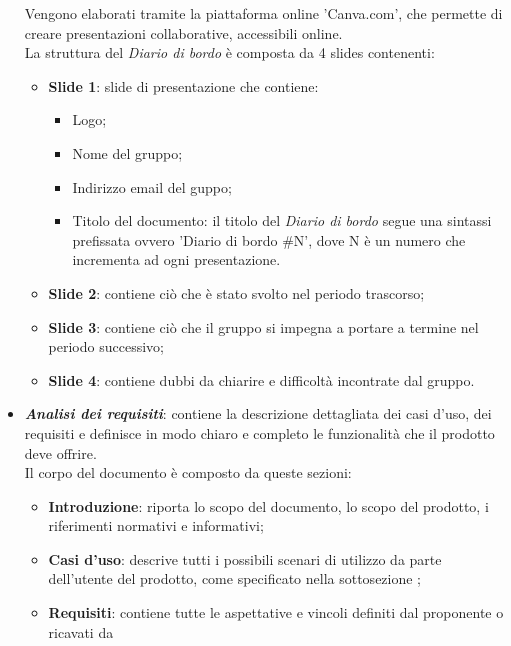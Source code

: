 \begin{itemize}
            Vengono elaborati tramite la piattaforma online 'Canva.com', che permette di creare presentazioni collaborative, accessibili online.\\
            La struttura del \textit{Diario di bordo} è composta da 4 slides contenenti:
            \begin{itemize}
                  \item \textbf{Slide 1}: slide di presentazione che contiene:
                        \begin{itemize}
                              \item Logo;
                              \item Nome del gruppo;
                              \item Indirizzo email del guppo;
                              \item Titolo del documento: il titolo del \textit{Diario di bordo} segue una sintassi
                                    prefissata ovvero 'Diario di bordo \#N', dove N è un numero che incrementa ad
                                    ogni presentazione.
                        \end{itemize}
                  \item \textbf{Slide 2}: contiene ciò che è stato svolto nel periodo trascorso;
                  \item \textbf{Slide 3}: contiene ciò che il gruppo si impegna a portare a termine nel periodo successivo;
                  \item \textbf{Slide 4}: contiene dubbi da chiarire e difficoltà incontrate dal gruppo.
            \end{itemize}
      \item \textit{\textbf{Analisi dei requisiti}}: contiene la descrizione dettagliata dei casi d'uso, dei
            requisiti e definisce in modo chiaro e completo le funzionalità che il prodotto deve offrire.
            \\Il corpo del documento è composto da queste sezioni:
            \begin{itemize}
                  \item \textbf{Introduzione}: riporta lo scopo del documento, lo scopo del prodotto, i riferimenti normativi e informativi;
                  \item \textbf{Casi d'uso}: descrive tutti i possibili scenari di utilizzo da parte dell'utente del prodotto,
                        come specificato nella sottosezione ;
                  \item \textbf{Requisiti}: contiene tutte le aspettative e vincoli definiti dal proponente o ricavati da

\end{itemize}
\end{itemize}
